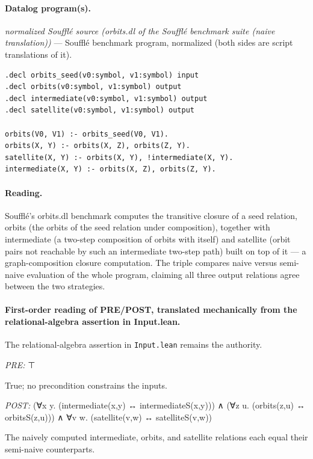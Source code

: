 \documentclass[10pt]{article}
\begin{document}
\paragraph{Datalog program(s).}

{\raggedright\textit{normalized Soufflé source (orbits.dl of the Soufflé benchmark suite (naive translation))} --- Soufflé benchmark program, normalized (both sides are script translations of it).\par}

\begin{Verbatim}[fontsize=\scriptsize,breaklines=true,breakanywhere=true,frame=single,framesep=1.5mm]
.decl orbits_seed(v0:symbol, v1:symbol) input
.decl orbits(v0:symbol, v1:symbol) output
.decl intermediate(v0:symbol, v1:symbol) output
.decl satellite(v0:symbol, v1:symbol) output

orbits(V0, V1) :- orbits_seed(V0, V1).
orbits(X, Y) :- orbits(X, Z), orbits(Z, Y).
satellite(X, Y) :- orbits(X, Y), !intermediate(X, Y).
intermediate(X, Y) :- orbits(X, Z), orbits(Z, Y).
\end{Verbatim}

\paragraph{Reading.} Soufflé's orbits.dl benchmark computes the transitive closure of a seed relation, orbits (the orbits of the seed relation under composition), together with intermediate (a two-step composition of orbits with itself) and satellite (orbit pairs not reachable by such an intermediate two-step path) built on top of it --- a graph-composition closure computation. The triple compares naive versus semi-naive evaluation of the whole program, claiming all three output relations agree between the two strategies.

\paragraph{First-order reading of PRE/POST, translated mechanically from the relational-algebra assertion in Input.lean.} The relational-algebra assertion in \texttt{Input.lean} remains the authority.

\textit{PRE:} ⊤\par True; no precondition constrains the inputs.

\textit{POST:} (∀x y. (intermediate(x,y) ↔ intermediateS(x,y))) ∧ (∀z u. (orbits(z,u) ↔ orbitsS(z,u))) ∧ ∀v w. (satellite(v,w) ↔ satelliteS(v,w))\par The naively computed intermediate, orbits, and satellite relations each equal their semi-naive counterparts.
\end{document}

